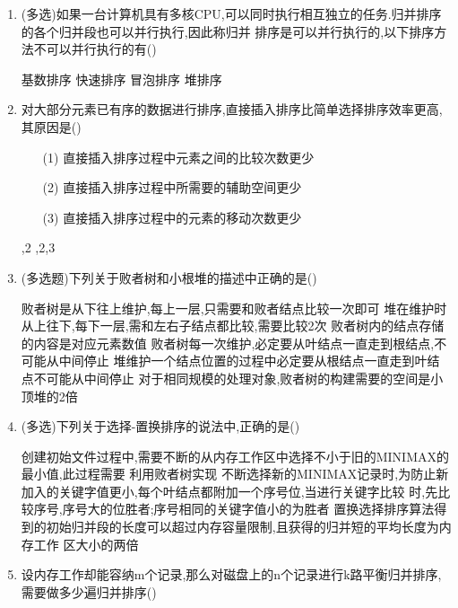 \documentclass[12pt, a4paper, oneside, UTF8]{ctexbook}
\begin{document}
\begin{enumerate}
    \item (多选)如果一台计算机具有多核CPU,可以同时执行相互独立的任务.归并排序的各个归并段也可以并行执行,因此称归并
    排序是可以并行执行的,以下排序方法不可以并行执行的有()
    \begin{choices}
        \task 基数排序 \task 快速排序 \task 冒泡排序 \task 堆排序 
    \end{choices}
    
    \item \bl 对大部分元素已有序的数据进行排序,直接插入排序比简单选择排序效率更高,其原因是()
    \begin{enumerate}
        \item [(1)] 直接插入排序过程中元素之间的比较次数更少
        \item [(2)] 直接插入排序过程中所需要的辅助空间更少
        \item [(3)] 直接插入排序过程中的元素的移动次数更少 
    \end{enumerate} 
    \begin{choices}
          ,2 ,2,3
    \end{choices}

    \item (多选题)下列关于败者树和小根堆的描述中正确的是()
    \begin{choices}[1]
        \task 败者树是从下往上维护,每上一层,只需要和败者结点比较一次即可
        \task 堆在维护时从上往下,每下一层,需和左右子结点都比较,需要比较2次
        \task 败者树内的结点存储的内容是对应元素数值
        \task 败者树每一次维护,必定要从叶结点一直走到根结点,不可能从中间停止 
        \task 堆维护一个结点位置的过程中必定要从根结点一直走到叶结点不可能从中间停止
        \task 对于相同规模的处理对象,败者树的构建需要的空间是小顶堆的2倍
    \end{choices}

    \item (多选)下列关于选择-置换排序的说法中,正确的是() 
    \begin{choices}[1]
        \task 创建初始文件过程中,需要不断的从内存工作区中选择不小于旧的MINIMAX的最小值,此过程需要
        利用败者树实现 
        \task 不断选择新的MINIMAX记录时,为防止新加入的关键字值更小,每个叶结点都附加一个序号位,当进行关键字比较
        时,先比较序号,序号大的位胜者;序号相同的关键字值小的为胜者 
        \task 置换选择排序算法得到的初始归并段的长度可以超过内存容量限制,且获得的归并短的平均长度为内存工作
        区大小的两倍 
    \end{choices}

    \item 设内存工作却能容纳m个记录,那么对磁盘上的n个记录进行k路平衡归并排序,需要做多少遍归并排序() 
\end{enumerate}
\newpage 
\end{document}
